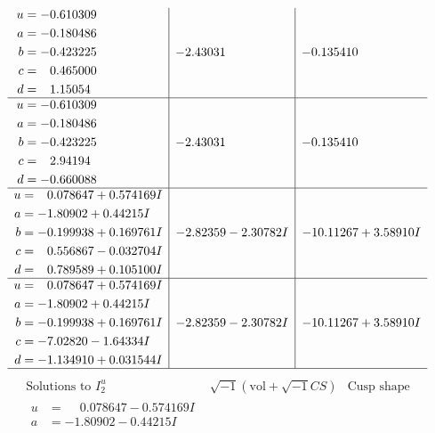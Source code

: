 \documentclass[1p]{elsarticle_modified}
\theoremstyle{definition}
\newcommand{\I}{\sqrt{-1}}
\begin{document}
$$\begin{array}{c|c|c}
\begin{aligned}
u &= -0.610309\phantom{ +0.000000I} \\
a &= -0.180486\phantom{ +0.000000I} \\
b &= -0.423225\phantom{ +0.000000I} \\
c &= \phantom{-}0.465000\phantom{ +0.000000I} \\
d &= \phantom{-}1.15054\phantom{ +0.000000I}\end{aligned}
 & -2.43031\phantom{ +0.000000I} & -0.135410\phantom{ +0.000000I} \\ \hline\begin{aligned}
u &= -0.610309\phantom{ +0.000000I} \\
a &= -0.180486\phantom{ +0.000000I} \\
b &= -0.423225\phantom{ +0.000000I} \\
c &= \phantom{-}2.94194\phantom{ +0.000000I} \\
d &= -0.660088\phantom{ +0.000000I}\end{aligned}
 & -2.43031\phantom{ +0.000000I} & -0.135410\phantom{ +0.000000I} \\ \hline\begin{aligned}
u &= \phantom{-}0.078647 + 0.574169 I \\
a &= -1.80902 + 0.44215 I \\
b &= -0.199938 + 0.169761 I \\
c &= \phantom{-}0.556867 - 0.032704 I \\
d &= \phantom{-}0.789589 + 0.105100 I\end{aligned}
 & -2.82359 - 2.30782 I & -10.11267 + 3.58910 I \\ \hline\begin{aligned}
u &= \phantom{-}0.078647 + 0.574169 I \\
a &= -1.80902 + 0.44215 I \\
b &= -0.199938 + 0.169761 I \\
c &= -7.02820 - 1.64334 I \\
d &= -1.134910 + 0.031544 I\end{aligned}
 & -2.82359 - 2.30782 I & -10.11267 + 3.58910 I\\
 \hline 
 \end{array}$$\newpage$$\begin{array}{c|c|c}  
\text{Solutions to }I^u_{2}& \I (\text{vol} + \sqrt{-1}CS) & \text{Cusp shape}\\
 \hline 
\begin{aligned}
u &= \phantom{-}0.078647 - 0.574169 I \\
a &= -1.80902 - 0.44215 I \\

\end{aligned}
\end{array}$$
\end{document}
